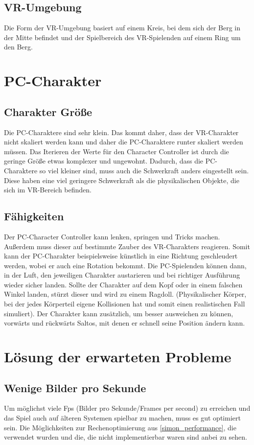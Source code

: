 \subsection{VR-Umgebung}
Die Form der VR-Umgebung basiert auf einem Kreis, bei dem sich der Berg in der Mitte befindet und der Spielbereich des VR-Spielenden auf einem Ring um den Berg.

\section{PC-Charakter}
\subsection{Charakter Größe}
Die PC-Charaktere sind sehr klein. Das kommt daher, dass der VR-Charakter nicht skaliert werden kann und daher die PC-Charaktere runter skaliert werden müssen. Das Iterieren der Werte für den Character Controller ist durch die geringe Größe etwas komplexer und ungewohnt. Dadurch, dass die PC-Charaktere so viel kleiner sind, muss auch die Schwerkraft anders eingestellt sein. Diese haben eine viel geringere Schwerkraft als die physikalischen Objekte, die sich im VR-Bereich befinden.

\subsection{Fähigkeiten}
Der PC-Character Controller kann lenken, springen und Tricks machen. Außerdem muss dieser auf bestimmte Zauber des VR-Charakters reagieren. Somit kann der PC-Charakter beispielsweise künstlich in eine Richtung geschleudert werden, wobei er auch eine Rotation bekommt. Die PC-Spielenden können dann, in der Luft, den jeweiligen Charakter austarieren und bei richtiger Ausführung wieder sicher landen. Sollte der Charakter auf dem Kopf oder in einem falschen Winkel landen, stürzt dieser und wird zu einem Ragdoll. (Physikalischer Körper, bei der jedes Körperteil eigene Kollisionen hat und somit einen realistischen Fall simuliert).
Der Charakter kann zusätzlich, um besser ausweichen zu können, vorwärts und rückwärts Saltos, mit denen er schnell seine Position ändern kann.


\section{Lösung der erwarteten Probleme}\label{simon_problems}

\subsection{Wenige Bilder pro Sekunde}
Um möglichst viele Fps (Bilder pro Sekunde/Frames per second) zu erreichen und das Spiel auch auf älteren Systemen spielbar zu machen, muss es gut optimiert sein. Die Möglichkeiten zur Rechenoptimierung aus \ref{simon_performance}, die verwendet wurden und die, die nicht implementierbar waren sind anbei zu sehen.

